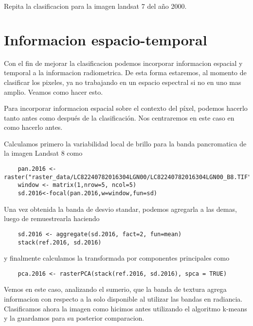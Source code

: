 \begin{act}
  Repita la clasificacion para la imagen landsat 7 del año 2000.
\end{act}


\section{Informacion espacio-temporal}
Con el fin de mejorar la clasificacion podemos incorporar informacion espacial y
temporal a la informacion radiometrica. De esta forma estaremos, al momento de
clasificar los pixeles, ya no trabajando en un espacio espectral si no en uno mas
amplio. Veamos como hacer esto.

\begin{exa}
  Para incorporar informacion espacial sobre el contexto del p\'ixel, podemos
  hacerlo tanto antes como despu\'es de la clasificaci\'on. Nos centraremos
  en este caso en como hacerlo antes.

  Calculamos primero la variabilidad local de brillo para la banda pancromatica
  de la imagen Landsat 8 como

  \begin{lstlisting}
    pan.2016 <- raster("raster_data/LC82240782016304LGN00/LC82240782016304LGN00_B8.TIF")
    window <- matrix(1,nrow=5, ncol=5)
    sd.2016<-focal(pan.2016,w=window,fun=sd)
  \end{lstlisting}

  Una vez obtenida la banda de desvio standar, podemos agregarla a las demas, luego
  de remuestrearla haciendo

  \begin{lstlisting}
    sd.2016 <- aggregate(sd.2016, fact=2, fun=mean)
    stack(ref.2016, sd.2016)
  \end{lstlisting}

  y finalmente calculamos la transformada por componentes principales como

  \begin{lstlisting}
    pca.2016 <- rasterPCA(stack(ref.2016, sd.2016), spca = TRUE)
  \end{lstlisting}

  Vemos en este caso, analizando el sumerio, que la banda de textura agrega informacion
  con respecto a la solo disponible al utilizar las bandas en radiancia. Clasificamos
  ahora la imagen como hicimos antes utilizando el algoritmo k-means y la guardamos para
  su posterior comparacion.
\end{exa}

